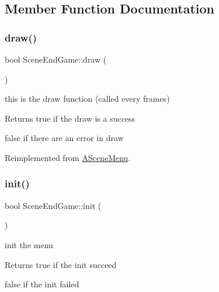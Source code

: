 \subsection{Member Function Documentation}
\mbox{\label{class_scene_end_game_a145614d80f41512a5bcf539278555d0c}} 
\subsubsection{\texorpdfstring{draw()}{draw()}}
{\footnotesize\ttfamily bool Scene\+End\+Game\+::draw (\begin{DoxyParamCaption}{ }\end{DoxyParamCaption})\hspace{0.3cm}{\ttfamily [virtual]}}



this is the draw function (called every frames) 

\begin{DoxyReturn}{Returns}
true if the draw is a success 

false if there are an error in draw 
\end{DoxyReturn}


Reimplemented from \hyperlink{class_a_scene_menu_a5c11f34c83f025e1181219bf25ce4694}{A\+Scene\+Menu}.

\mbox{\label{class_scene_end_game_a9503a63d52d2a11dbc56c97f35ff6eae}} 
\subsubsection{\texorpdfstring{init()}{init()}}
{\footnotesize\ttfamily bool Scene\+End\+Game\+::init (\begin{DoxyParamCaption}{ }\end{DoxyParamCaption})\hspace{0.3cm}{\ttfamily [virtual]}}



init the menu 

\begin{DoxyReturn}{Returns}
true if the init succeed 

false if the init failed 
\end{DoxyReturn}


